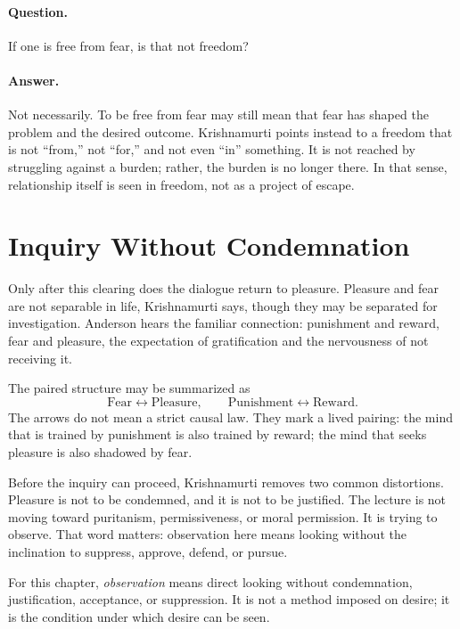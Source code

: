 \paragraph{Question.}
If one is free from fear, is that not freedom?

\paragraph{Answer.}
Not necessarily. To be free from fear may still mean that fear has shaped the problem and the desired outcome. Krishnamurti points instead to a freedom that is not ``from,'' not ``for,'' and not even ``in'' something. It is not reached by struggling against a burden; rather, the burden is no longer there. In that sense, relationship itself is seen in freedom, not as a project of escape.

\section{Inquiry Without Condemnation}

Only after this clearing does the dialogue return to pleasure. Pleasure and fear are not separable in life, Krishnamurti says, though they may be separated for investigation. Anderson hears the familiar connection: punishment and reward, fear and pleasure, the expectation of gratification and the nervousness of not receiving it.

The paired structure may be summarized as
\begin{equation}
\mathrm{Fear} \leftrightarrow \mathrm{Pleasure},
\qquad
\mathrm{Punishment} \leftrightarrow \mathrm{Reward}.
\end{equation}
The arrows do not mean a strict causal law. They mark a lived pairing: the mind that is trained by punishment is also trained by reward; the mind that seeks pleasure is also shadowed by fear.

Before the inquiry can proceed, Krishnamurti removes two common distortions. Pleasure is not to be condemned, and it is not to be justified. The lecture is not moving toward puritanism, permissiveness, or moral permission. It is trying to observe. That word matters: observation here means looking without the inclination to suppress, approve, defend, or pursue.

\begin{definition}
For this chapter, \emph{observation} means direct looking without condemnation, justification, acceptance, or suppression. It is not a method imposed on desire; it is the condition under which desire can be seen.
\end{definition}

